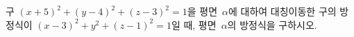구 $(x+5)^2+(y-4)^2+(z-3)^2=1$을 평면~$\alpha$에 대하여 대칭이동한 구의 방정식이 $(x-3)^2+y^2+(z-1)^2=1$일 때, 평면~$\alpha$의 방정식을 구하시오.
